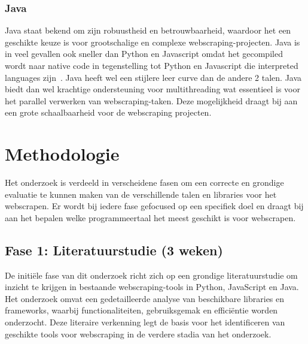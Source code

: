 \subsubsection{Java}
Java staat bekend om zijn robuustheid en betrouwbaarheid, waardoor het een geschikte keuze is voor grootschalige en 
complexe webscraping-projecten. Java is in veel gevallen ook sneller dan Python en Javascript omdat het gecompiled wordt naar
native code in tegenstelling tot Python en Javascript die interpreted languages zijn~\autocite{Chukwuebuka2023}. Java heeft wel een stijlere leer curve
dan de andere 2 talen. Java biedt dan wel krachtige ondersteuning voor multithreading wat essentieel is voor het parallel
verwerken van webscraping-taken. Deze mogelijkheid draagt bij aan een grote schaalbaarheid voor de webscraping projecten.



\section{Methodologie}%
\label{sec:methodologie}
Het onderzoek is verdeeld in verscheidene fasen om een correcte en grondige evaluatie te kunnen maken van de verschillende talen
en libraries voor het webscrapen. Er wordt bij iedere fase gefocused op een specifiek doel en draagt bij aan het bepalen welke
programmeertaal het meest geschikt is voor webscrapen.

\subsection{Fase 1: Literatuurstudie (3 weken)}
De initiële fase van dit onderzoek richt zich op een grondige literatuurstudie om inzicht te krijgen in bestaande webscraping-tools in Python,
JavaScript en Java. Het onderzoek omvat een gedetailleerde analyse van beschikbare libraries en frameworks, 
waarbij functionaliteiten, gebruiksgemak en efficiëntie worden onderzocht. Deze literaire verkenning legt de 
basis voor het identificeren van geschikte tools voor webscraping in de verdere stadia van het onderzoek.

